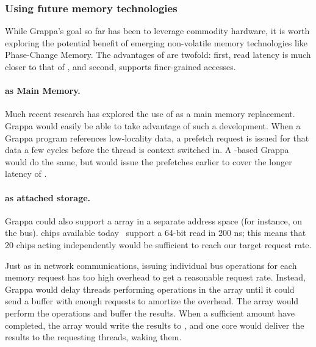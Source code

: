 \subsubsection{Using future memory technologies}

While Grappa's goal so far has been to leverage commodity hardware, it
is worth exploring the potential benefit of emerging non-volatile
memory technologies like Phase-Change Memory. The advantages of 
are twofold: first, read latency is much closer to that of , and
second,  supports finer-grained accesses.

\paragraph{ as Main Memory.}
Much recent research has explored the use of  as a main memory
replacement. Grappa would easily be able to take advantage of such a
development. When a Grappa program references low-locality data,
a prefetch request is issued for that data a few cycles before the
thread is context switched in. A -based
Grappa would do the same, but would issue the prefetches earlier to
cover the longer latency of .

\paragraph{ as attached storage.}
Grappa could also support a  array in a separate address space (for
instance, on the  bus).  chips available today~\cite{micronPCM} support a
64-bit read in 200 ns; this means that 20 chips acting independently
would be sufficient to reach our target request rate.

Just as in network communications, issuing individual  bus
operations for each memory request has too high overhead to get a
reasonable request rate.  Instead, Grappa would delay threads
performing operations in the  array until it could send a buffer
with enough requests to amortize the overhead. The  array would
perform the operations and buffer the results. When a sufficient
amount have completed, the  array would write the results to \@,
and one core would deliver the results to the requesting threads,
waking them.

